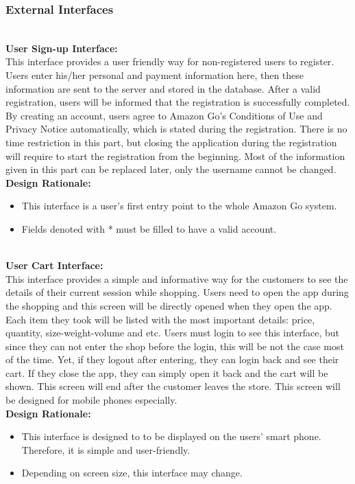 \documentclass[11pt]{article}
\newcounter{subsubsubsection}[subsubsection]
\begin{document}
    \subsubsection{External Interfaces}

    \textbf{\\User Sign-up Interface:\\}
    This interface provides a user friendly way for non-registered users to register. Users enter his/her personal and payment information
    here, then these information are sent to the server and stored in the database.
    After a valid registration, users will be informed that the registration is successfully
    completed. By creating an account, users agree to Amazon Go's Conditions of Use
    and Privacy Notice automatically, which is stated during the registration. There is
    no time restriction in this part, but closing the application during the registration
    will require to start the registration from the beginning. Most of the information
    given in this part can be replaced later, only the username cannot be changed.
    \textbf{\\Design Rationale:}
    \begin{itemize}
       \item This interface is a user's first entry point to the whole Amazon Go system. 
       \item Fields denoted with * must be filled to have a valid account.
    \end{itemize}

    \textbf{\\User Cart Interface:\\}
    This interface provides a simple and informative way for
    the customers to see the details of their current session while shopping. Users need
    to open the app during the shopping and this screen will be directly opened when
    they open the app. Each item they took will be listed with the most important
    details: price, quantity, size-weight-volume and etc. Users must login to see this
    interface, but since they can not enter the shop before the login, this will be not the
    case most of the time. Yet, if they logout after entering, they can login back and see
    their cart. If they close the app, they can simply open it back and the cart will be
    shown. This screen will end after the customer leaves the store. This screen will be 
    designed for mobile phones especially.
    \textbf{\\Design Rationale:}
    \begin{itemize}
       \item This interface is designed to to be displayed on the users' smart phone. Therefore, it is simple and user-friendly.
       \item Depending on screen size, this interface may change. 
    \end{itemize}
\end{document}
